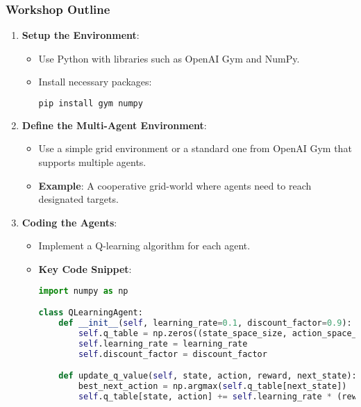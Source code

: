 \documentclass[aspectratio=169]{beamer}
\begin{document}
\begin{frame}[fragile]
    \frametitle{Workshop Outline}
    
    \begin{enumerate}
        \item \textbf{Setup the Environment}:
            \begin{itemize}
                \item Use Python with libraries such as OpenAI Gym and NumPy.
                \item Install necessary packages:
                \begin{lstlisting}[language=bash]
pip install gym numpy
                \end{lstlisting}
            \end{itemize}

        \item \textbf{Define the Multi-Agent Environment}:
            \begin{itemize}
                \item Use a simple grid environment or a standard one from OpenAI Gym that supports multiple agents.
                \item \textbf{Example}: A cooperative grid-world where agents need to reach designated targets.
            \end{itemize}

        \item \textbf{Coding the Agents}:
            \begin{itemize}
                \item Implement a Q-learning algorithm for each agent.
                \item \textbf{Key Code Snippet}:
                \begin{lstlisting}[language=python]
import numpy as np

class QLearningAgent:
    def __init__(self, learning_rate=0.1, discount_factor=0.9):
        self.q_table = np.zeros((state_space_size, action_space_size))
        self.learning_rate = learning_rate
        self.discount_factor = discount_factor

    def update_q_value(self, state, action, reward, next_state):
        best_next_action = np.argmax(self.q_table[next_state])
        self.q_table[state, action] += self.learning_rate * (reward + self.discount_factor * self.q_table[next_state, best_next_action] - self.q_table[state, action])
                \end{lstlisting}
            \end{itemize}
    \end{enumerate}
\end{frame}
\end{document}
